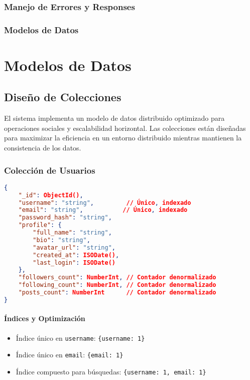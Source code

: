 \documentclass[12pt,letterpaper]{article}
\begin{document}
\subsubsection{Manejo de Errores y Responses}
\subsubsection{Modelos de Datos}

\section{Modelos de Datos}
\subsection{Diseño de Colecciones}
El sistema implementa un modelo de datos distribuido optimizado para operaciones sociales y escalabilidad horizontal. Las colecciones están diseñadas para maximizar la eficiencia en un entorno distribuido mientras mantienen la consistencia de los datos.

\subsubsection{Colección de Usuarios}
\begin{lstlisting}[language=json]
{
    "_id": ObjectId(),
    "username": "string",         // Único, indexado
    "email": "string",           // Único, indexado
    "password_hash": "string",
    "profile": {
        "full_name": "string",
        "bio": "string",
        "avatar_url": "string",
        "created_at": ISODate(),
        "last_login": ISODate()
    },
    "followers_count": NumberInt, // Contador denormalizado
    "following_count": NumberInt, // Contador denormalizado
    "posts_count": NumberInt      // Contador denormalizado
}
\end{lstlisting}

\paragraph{Índices y Optimización}
\begin{itemize}
    \item Índice único en \texttt{username}: \texttt{\{username: 1\}}
    \item Índice único en \texttt{email}: \texttt{\{email: 1\}}
    \item Índice compuesto para búsquedas: \texttt{\{username: 1, email: 1\}}
\end{itemize}
\end{document}
